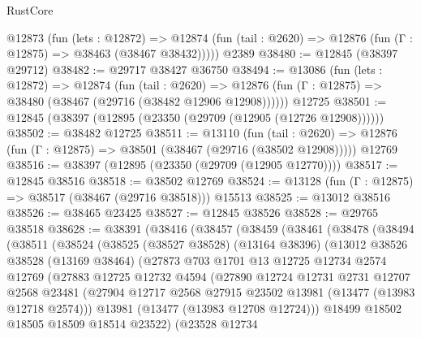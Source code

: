 \begin{lexlean}{RustCore}
\begin{coremodule}
    @12873
      (fun (lets : @12872) =>
      @12874 (fun (tail : @2620) => @12876 (fun (Γ : @12875) => @38463 (@38467 @38432)))))
    @2389
@38480 := @12845 (@38397 @29712)
@38482 := @29717 @38427 @36750
@38494 := @13086
    (fun (lets : @12872) =>
    @12874
      (fun (tail : @2620) =>
      @12876 (fun (Γ : @12875) => @38480 (@38467 (@29716 (@38482 @12906 @12908))))))
    @12725
@38501 := @12845 (@38397 (@12895 (@23350 (@29709 (@12905 (@12726 @12908))))))
@38502 := @38482 @12725
@38511 := @13110
    (fun (tail : @2620) => @12876 (fun (Γ : @12875) => @38501 (@38467 (@29716 (@38502 @12908)))))
    @12769
@38516 := @38397 (@12895 (@23350 (@29709 (@12905 @12770))))
@38517 := @12845 @38516
@38518 := @38502 @12769
@38524 := @13128 (fun (Γ : @12875) => @38517 (@38467 (@29716 @38518))) @15513
@38525 := @13012 @38516
@38526 := @38465 @23425
@38527 := @12845 @38526
@38528 := @29765 @38518
@38628 := @38391
    (@38416
      (@38457
        (@38459
          (@38461
            (@38478
              (@38494
                (@38511
                  (@38524
                    (@38525
                      (@38527 @38528)
                      (@13164 @38396)
                      (@13012
                        @38526
                        @38528
                        (@13169 @38464)
                        (@27873
                          @703
                          @1701
                          @13
                          @12725
                          @12734
                          @2574
                          @12769
                          (@27883
                            @12725
                            @12732
                            @4594
                            (@27890
                              @12724
                              @12731
                              @2731
                              @12707
                              @2568
                              @23481
                              (@27904
                                @12717
                                @2568
                                @27915
                                @23502
                                @13981
                                (@13477 (@13983 @12718 @2574)))
                              @13981
                              (@13477 (@13983 @12708 @12724)))
                            @18499
                            @18502
                            @18505
                            @18509
                            @18514
                            @23522)
                          (@23528
                            @12734

\end{coremodule}
\end{lexlean}
